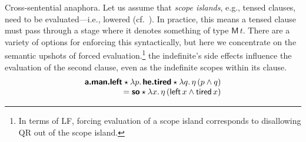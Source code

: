	Cross-sentential anaphora. Let us assume that \emph{scope islands}, e.g., tensed clauses, need to be evaluated---i.e., lowered (cf.~\citealt{Barker:2002, BarkerShan:2008}). In practice, this means a tensed clause must pass through a stage where it denotes something of type $\textsf{M}\,t$. There are a variety of options for enforcing this syntactically, but here we concentrate on the semantic upshots of forced evaluation.\footnote{In terms of LF, forcing evaluation of a scope island corresponds to disallowing QR out of the scope island.} the indefinite's side effects influence the evaluation of the second clause, even as the indefinite scopes within its clause. %
	\[\begin{array}{r}
		\bsf{a.man.left} \star \lambda p.\,\bsf{he.tired} \star \lambda q.\,\eta\,(p \wedge q)%
		\\
		= \bsf{so} \star \lambda x.\,\eta\,(\textsf{left}\,x \wedge \textsf{tired}\,x)%
	\end{array}\]
